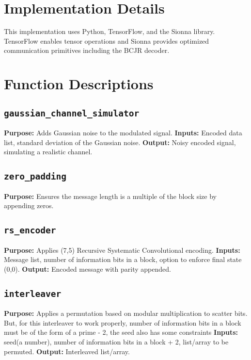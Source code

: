 \documentclass[12pt]{article}
\begin{document}
\section*{Implementation Details}
This implementation uses Python, TensorFlow, and the Sionna library. TensorFlow enables tensor operations and Sionna provides optimized communication primitives including the BCJR decoder.

\section*{Function Descriptions}

\subsection*{\texttt{gaussian\_channel\_simulator}}
\textbf{Purpose:} Adds Gaussian noise to the modulated signal.\newline
\textbf{Inputs:} Encoded data list, standard deviation of the Gaussian noise.\newline
\textbf{Output:} Noisy encoded signal, simulating a realistic channel.

\subsection*{\texttt{zero\_padding}}
\textbf{Purpose:} Ensures the message length is a multiple of the block size by appending zeros.

\subsection*{\texttt{rs\_encoder}}
\textbf{Purpose:} Applies (7,5) Recursive Systematic Convolutional encoding.\newline
\textbf{Inputs:} Message list, number of information bits in a block, option to enforce final state (0,0).\newline
\textbf{Output:} Encoded message with parity appended.

\subsection*{\texttt{interleaver}}
\textbf{Purpose:} Applies a permutation based on modular multiplication to scatter bits. But, for this interleaver to work properly, number of information bits in a block must be of the form of a prime - 2, the seed also has some constraints\newline
\textbf{Inputs:} seed(a number), number of information bits in a block + 2, list/array to be permuted.\newline
\textbf{Output:} Interleaved list/array.
\end{document}

